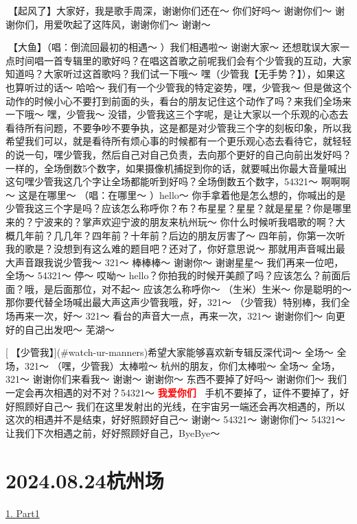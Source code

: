 \documentclass[
]{book}
\begin{document}
🎵【起风了】大家好，我是歌手周深，谢谢你们还在～ 你们好吗～ 谢谢你们～ 谢谢你们，用爱吹起了这阵风，谢谢你们～ 谢谢～

🎵【大鱼】（唱：倒流回最初的相遇～ ）我们相遇啦～ 谢谢大家～
还想耽误大家一点时间唱一首专辑里的歌好吗？在唱这首歌之前呢我们会有个少管我的互动，大家知道吗？大家听过这首歌吗？我们试一下哦～ 嘿（少管我【无手势？】），如果这也算听过的话～ 哈哈～ 我们有一个少管我的特定姿势，嘿，少管我～ 但是做这个动作的时候小心不要打到前面的头，看台的朋友记住这个动作了吗？来我们全场来一下哦～ 嘿，少管我～ 没错，少管我这三个字呢，是让大家以一个乐观的心态去看待所有问题，不要争吵不要争执，这是都是对少管我三个字的刻板印象，所以我希望我们可以，就是看待所有烦心事的时候都有一个更乐观心态去看待它，就轻轻的说一句，嘿少管我，然后自己对自己负责，去向那个更好的自己向前出发好吗？一样的，全场倒数5个数字，如果摄像机捕捉到你的话，就要喊出你最大音量喊出这句嘿少管我这几个字让全场都能听到好吗？全场倒数五个数字，54321～ 啊啊啊～ 这是在哪里～ （唱：在哪里～ ）hello～ 你手拿着他是怎么想的，你喊出的是少管我这三个字是吗？应该怎么称呼你？布？布星星？星星？就是星星？你是哪里来的？宁波来的？掌声欢迎宁波的朋友来杭州玩～ 你什么时候听我唱歌的啊？大概几年前？几几年？四年前？十年前？后边的朋友厉害了～ 四年前，你第一次听我的歌是？没想到有这么难的题目吧？还对了，你好意思说～ 那就用声音喊出最大声音跟我说少管我～ 321～ 棒棒棒～ 谢谢你～ 谢谢星星～ 我们再来一位吧，全场～ 54321～ 停～ 哎呦～ hello？你拍我的时候开美颜了吗？应该怎么？前面后面？哦，是后面那位，对不起～ 应该怎么称呼你～ （生米）生米～ 你是聪明的～ 那你要代替全场喊出最大声这声少管我哦，好，321～ （少管我）特别棒，我们全场再来一次，好～ 321～ 看台的声音大一点，再来一次，321～ 谢谢你们～ 向更好的自己出发吧～ 芜湖～

[🎵【少管我】](#watch-ur-manners)希望大家能够喜欢新专辑反深代词～ 全场～ 全场，321～ （嘿，少管我）太棒啦～ 杭州的朋友，你们太棒啦～ 全场～ 全场，321～ 谢谢你们来看我～ 谢谢～ 谢谢你～ 东西不要掉了好吗～ 谢谢你们～ 我们一定会再次相遇的对不对？54321～ \textbf{\textcolor{red}{我爱你们~} } 手机不要掉了，证件不要掉了，好好照顾好自己～ 我们在这里发射出的光线，在宇宙另一端还会再次相遇的，所以这次的相遇并不是结束，好好照顾好自己～ 谢谢～ 54321～ 谢谢你们～ 54321～ 让我们下次相遇之前，好好照顾好自己，ByeBye～

\chapter{2024.08.24杭州场}\label{hangzhou-20240824}

\hyperref[hangzhou-20240824-part1]{1. Part1}
\end{document}
